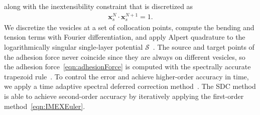 \documentclass[%
preprint,
 amsmath,amssymb,
 aps,
]{revtex4-1}
\renewcommand{\SS}{\mathcal{S}}
\newcommand{\xx}{\mathbf{x}}
\begin{document}
along with the inextensibility constraint that is discretized as
\begin{align*}
  \xx_s^{N} \cdot \xx_{s}^{N+1} = 1.
\end{align*}
We discretize the vesicles at a set of collocation points, compute the
bending and tension terms with Fourier differentiation, and apply
Alpert quadrature to the logarithmically singular single-layer potential
$\SS$~\cite{alp1999}.  The source and target points of the adhesion
force never coincide since they are always on different vesicles, so the
adhesion force~\eqref{eqn:adhesionForce} is computed with the spectrally
accurate trapezoid rule~\cite{tre-wei2014}.  To control the error and
achieve higher-order accuracy in time, we apply a time adaptive spectral
deferred correction method~\cite{qua-bir2016}.  The SDC method is able
to achieve second-order accuracy by iteratively applying the first-order
method~\eqref{eqn:IMEXEuler}.


\end{document}
